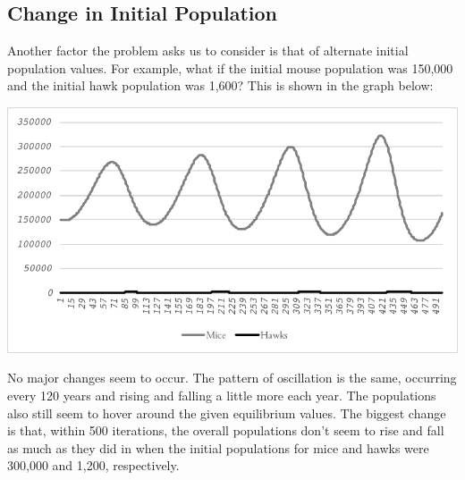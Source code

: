 \documentclass[10pt,letterpaper]{article}
\begin{document}
		\subsection{Change in Initial Population}
			Another factor the problem asks us to consider is that of alternate initial population values. For example, what if the initial mouse population was 150,000 and the initial hawk population was 1,600? This is shown in the graph below:
			\newline \newline 
			\centerline{\includegraphics{graph3.pdf}}
			\newline \newline 
			No major changes seem to occur. The pattern of oscillation is the same, occurring every 120 years and rising and falling a little more each year. The populations also still seem to hover around the given equilibrium values. The biggest change is that, within 500 iterations, the overall populations don't seem to rise and fall as much as they did in when the initial populations for mice and hawks were 300,000 and 1,200, respectively.
\end{document}
